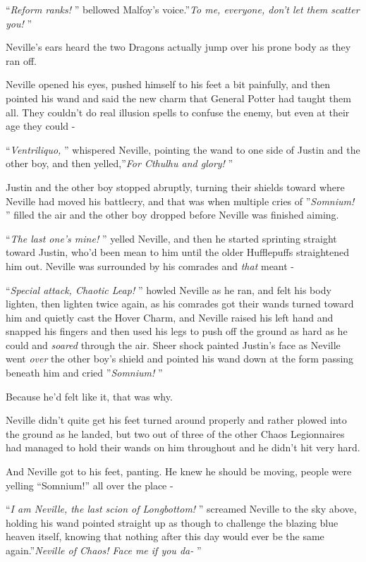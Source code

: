 ``\emph{Reform ranks!} '' bellowed Malfoy's voice.''\emph{To me, everyone,
don't let them scatter you!} ''

Neville's ears heard the two Dragons actually jump over his prone body
as they ran off.

Neville opened his eyes, pushed himself to his feet a bit painfully, and
then pointed his wand and said the new charm that General Potter had
taught them all. They couldn't do real illusion spells to confuse the
enemy, but even at their age they could -

``\emph{Ventriliquo,} '' whispered Neville, pointing the wand to one side
of Justin and the other boy, and then yelled,''\emph{For Cthulhu and
glory!} ''

Justin and the other boy stopped abruptly, turning their shields toward
where Neville had moved his battlecry, and that was when multiple cries
of ''\emph{Somnium!} '' filled the air and the other boy dropped before
Neville was finished aiming.

``\emph{The last one's mine!} '' yelled Neville, and then he started
sprinting straight toward Justin, who'd been mean to him until the older
Hufflepuffs straightened him out. Neville was surrounded by his comrades
and \emph{that} meant -

``\emph{Special attack, Chaotic Leap!} '' howled Neville as he ran, and
felt his body lighten, then lighten twice again, as his comrades got
their wands turned toward him and quietly cast the Hover Charm, and
Neville raised his left hand and snapped his fingers and then used his
legs to push off the ground as hard as he could and \emph{soared}
through the air. Sheer shock painted Justin's face as Neville went
\emph{over} the other boy's shield and pointed his wand down at the form
passing beneath him and cried ''\emph{Somnium!} ''

Because he'd felt like it, that was why.

Neville didn't quite get his feet turned around properly and rather
plowed into the ground as he landed, but two out of three of the other
Chaos Legionnaires had managed to hold their wands on him throughout and
he didn't hit very hard.

And Neville got to his feet, panting. He knew he should be moving,
people were yelling ``Somnium!'' all over the place -

``\emph{I am Neville, the last scion of Longbottom!} '' screamed Neville
to the sky above, holding his wand pointed straight up as though to
challenge the blazing blue heaven itself, knowing that nothing after
this day would ever be the same again.''\emph{Neville of Chaos! Face me
if you da-} ''

